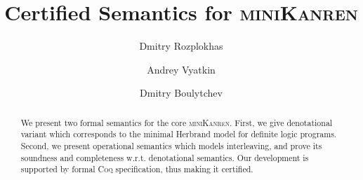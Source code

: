 \documentclass[sigplan,10pt,anonymous,review]{acmart}
\begin{document}
\title{Certified Semantics for \textsc{miniKanren}} %



\author{Dmitry Rozplokhas}

\author{Andrey Vyatkin}

\author{Dmitry Boulytchev}



\begin{abstract}
  We present two formal semantics for the core \textsc{miniKanren}. First, we give denotational
  variant which corresponds to the minimal Herbrand model for definite logic programs. Second,
  we present operational semantics which models interleaving, and prove its soundness and
  completeness w.r.t. denotational semantics. Our development is supported by formal \textsc{Coq}
  specification, thus making it certified.
\end{abstract}
\end{document}
